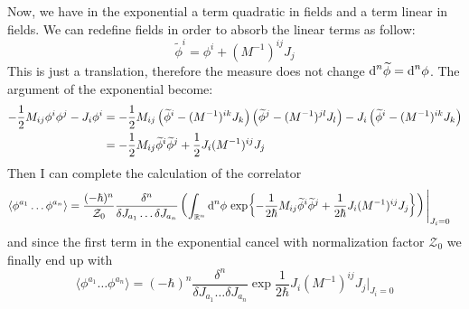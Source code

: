\documentclass[../main/main.tex]{subfiles}
\begin{document}
Now, we have in the exponential a term quadratic in fields and a term linear in fields. We can redefine fields in order to absorb the linear terms as follow:
\[\widetilde\phi^i=\phi^i+(M^{-1})^{ij}J_j\]
This is just a translation, therefore the measure does not change $\textup{d}^n\widetilde\phi=\textup{d}^n\phi$. The argument of the exponential become:
\begin{align*}
-\frac12M_{ij}\phi^i\phi^j-J_i\phi^i
&=-\frac12M_{ij}\left(\widetilde\phi^i-(M^{-1})^{ik}J_k\right)\left(\widetilde\phi^j-(M^{-1})^{jl}J_l\right)-J_i\left(\widetilde\phi^i-(M^{-1})^{ik}J_k\right)\\
&=-\frac12M_{ij}\widetilde\phi^i\widetilde\phi^j+\frac12J_i(M^{-1})^{ij}J_j
\end{align*}
Then I can complete the calculation of the correlator
\begin{align*}
\langle\phi^{a_1}\dots\phi^{a_n}\rangle
&=\frac{(-\hbar)^n}{\mathcal Z_0}\frac{\delta^n}{\delta J_{a_1}\dots \delta J_{a_n}}\left(\int_{\mathbb{R}^n}\textup{d}^n\phi\,\exp{-\frac1{2\hbar}M_{ij}\widetilde\phi^i\widetilde\phi^j+\frac1{2\hbar}J_i(M^{-1})^{ij}J_j}\right)\Bigg\vert_{J_i=0}
\end{align*}
and since the first term in the exponential cancel with normalization factor $\mathcal Z_0$ we finally end up with
\begin{equation}\label{eqn:0-dim-corr-fin}\boxed{
\langle\phi^{a_1}\dots\phi^{a_n}\rangle
=(-\hbar)^n\frac{\delta^n}{\delta J_{a_1}\dots \delta J_{a_n}}\exp{\frac1{2\hbar}J_i(M^{-1})^{ij}J_j}\Bigg\vert_{J_i=0}
}\end{equation}
\end{document}
